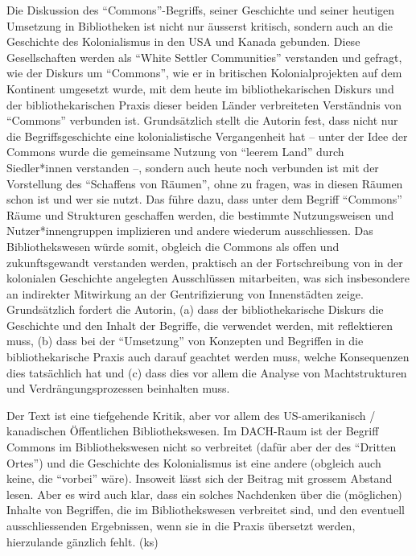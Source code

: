 \documentclass[a4paper,
fontsize=11pt,
oneside,
numbers=noperiodatend,
parskip=half-,
bibliography=totoc,
final
]{scrartcl}
\begin{document}
Die Diskussion des \enquote{Commons}-Begriffs, seiner Geschichte und
seiner heutigen Umsetzung in Bibliotheken ist nicht nur äusserst
kritisch, sondern auch an die Geschichte des Kolonialismus in den USA
und Kanada gebunden. Diese Gesellschaften werden als \enquote{White
Settler Communities} verstanden und gefragt, wie der Diskurs um
\enquote{Commons}, wie er in britischen Kolonialprojekten auf dem
Kontinent umgesetzt wurde, mit dem heute im bibliothekarischen Diskurs
und der bibliothekarischen Praxis dieser beiden Länder verbreiteten
Verständnis von \enquote{Commons} verbunden ist. Grundsätzlich stellt
die Autorin fest, dass nicht nur die Begriffsgeschichte eine
kolonialistische Vergangenheit hat -- unter der Idee der Commons wurde
die gemeinsame Nutzung von \enquote{leerem Land} durch Siedler*innen
verstanden --, sondern auch heute noch verbunden ist mit der Vorstellung
des \enquote{Schaffens von Räumen}, ohne zu fragen, was in diesen Räumen
schon ist und wer sie nutzt. Das führe dazu, dass unter dem Begriff
\enquote{Commons} Räume und Strukturen geschaffen werden, die bestimmte
Nutzungsweisen und Nutzer*innengruppen implizieren und andere wiederum
ausschliessen. Das Bibliothekswesen würde somit, obgleich die Commons
als offen und zukunftsgewandt verstanden werden, praktisch an der
Fortschreibung von in der kolonialen Geschichte angelegten Ausschlüssen
mitarbeiten, was sich insbesondere an indirekter Mitwirkung an der
Gentrifizierung von Innenstädten zeige. Grundsätzlich fordert die
Autorin, (a) dass der bibliothekarische Diskurs die Geschichte und den
Inhalt der Begriffe, die verwendet werden, mit reflektieren muss, (b)
dass bei der \enquote{Umsetzung} von Konzepten und Begriffen in die
bibliothekarische Praxis auch darauf geachtet werden muss, welche
Konsequenzen dies tatsächlich hat und (c) dass dies vor allem die
Analyse von Machtstrukturen und Verdrängungsprozessen beinhalten muss.

Der Text ist eine tiefgehende Kritik, aber vor allem des US-amerikanisch
/ kanadischen Öffentlichen Bibliothekswesen. Im DACH-Raum ist der
Begriff Commons im Bibliothekswesen nicht so verbreitet (dafür aber der
des \enquote{Dritten Ortes}) und die Geschichte des Kolonialismus ist
eine andere (obgleich auch keine, die \enquote{vorbei} wäre). Insoweit
lässt sich der Beitrag mit grossem Abstand lesen. Aber es wird auch
klar, dass ein solches Nachdenken über die (möglichen) Inhalte von
Begriffen, die im Bibliothekswesen verbreitet sind, und den eventuell
ausschliessenden Ergebnissen, wenn sie in die Praxis übersetzt werden,
hierzulande gänzlich fehlt. (ks)
\end{document}
